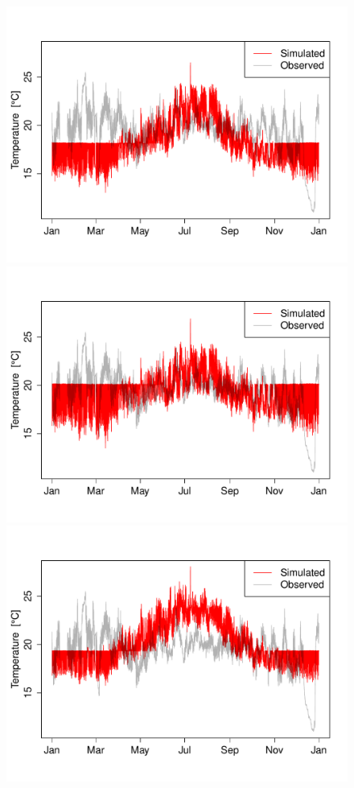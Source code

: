 \documentclass[a4paper, 12pt]{article}
\begin{document}
\newcommand{\scl}{0.38}
\begin{figure}
\centering
\includegraphics[scale=\scl]{Temperatures/Simulated/Sim_Kitch_863}
\includegraphics[scale=\scl]{Temperatures/Simulated/Sim_Kitch_384_noylab}
\includegraphics[scale=\scl]{Temperatures/Simulated/Sim_Kitch_949}

\end{figure}
\end{document}
